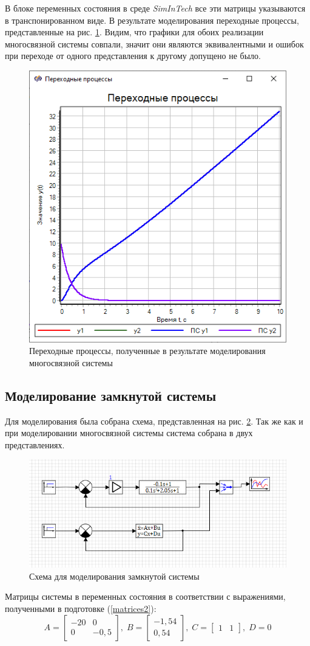 	В блоке переменных состояния в среде \textit{SimInTech} все эти матрицы указываются в транспонированном виде. В результате моделирования переходные процессы, представленные на рис. \ref{graph1}. Видим, что графики для обоих реализации многосвязной системы совпали, значит они являются эквивалентными и ошибок при переходе от одного представления к другому допущено не было.
	
	\begin{figure}[h]
		\centering\includegraphics[width=.45\textwidth]{png/graph1.png}
		\caption{Переходные процессы, полученные в результате моделирования многосвязной системы}
		\label{graph1}
	\end{figure}
	
	\subsection{Моделирование замкнутой системы}
	
	Для моделирования была собрана схема, представленная на рис. \ref{scheme2}. Так же как и при моделировании многосвязной системы система собрана в двух представлениях.
		
	\begin{figure}[h]
		\centering\includegraphics[width=.6\textwidth]{png/scheme2.png}
		\caption{Схема для моделирования замкнутой системы}
		\label{scheme2}
	\end{figure}

	Матрицы системы в переменных состояния в соответствии с выражениями, полученными в подготовке (\ref{matrices2}):
		\begin{equation*}
		A = \begin{bmatrix}
			-20 & 0 \\
			0 & -0,5
		\end{bmatrix},\; 
		B = \begin{bmatrix}
			-1,54 \\ 0,54
		\end{bmatrix},\;
		C = \begin{bmatrix}
			1 & 1
		\end{bmatrix},\;D=0
	\end{equation*}

